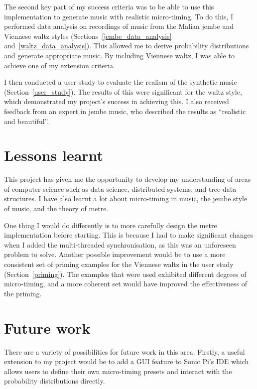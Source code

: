 \documentclass[12pt,twoside,openright]{report}
\begin{document}
The second key part of my success criteria was to be able to use this
implementation to generate music with realistic micro-timing. To do this, I
performed data analysis on recordings of music from the Malian jembe and
Viennese waltz styles (Sections~\ref{jembe_data_analysis} and~\ref{waltz_data_analysis}). This allowed me to derive probability distributions and
generate appropriate music. By including Viennese waltz, I was able to achieve
one of my extension criteria.

I then conducted a user study to evaluate the realism of the synthetic music (Section~\ref{user_study}).
The results of this were significant for the waltz style, which demonstrated my
project's success in achieving this. I also received feedback from an expert in
jembe music, who described the results as ``realistic and beautiful''.



\section{Lessons learnt} \label{lessons_learnt}

This project has given me the opportunity to develop my understanding of areas
of computer science such as data science, distributed systems, and tree data
structures. I have also learnt a lot about micro-timing in music, the jembe
style of music, and the theory of metre.

One thing I would do differently is to more carefully design the metre
implementation before starting. This is because I had to make significant
changes when I added the multi-threaded synchronisation, as this was an
unforeseen problem to solve. Another possible improvement would be to
use a more consistent set of priming examples for the Viennese waltz in the user
study (Section~\ref{priming}). The examples that were used exhibited different degrees of
micro-timing, and a more coherent set would have improved the effectiveness of
the priming.



\section{Future work} \label{future_work}

There are a variety of possibilities for future work in this area. Firstly, a
useful extension to my project would be to add a GUI feature to Sonic Pi's IDE
which allows users to define their own micro-timing presets and interact with
the probability distributions directly.
\end{document}
